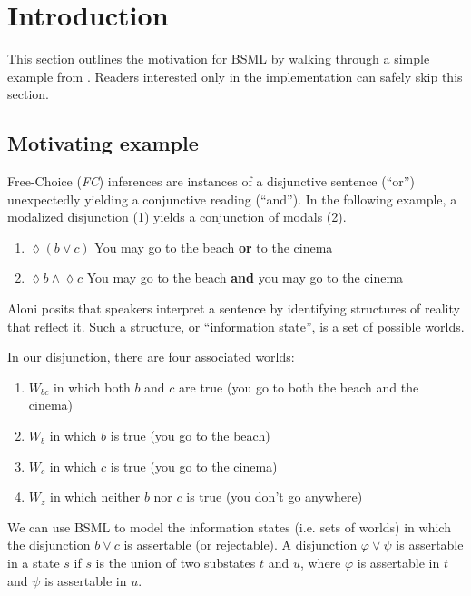 \section{Introduction}
This section outlines the motivation for BSML by walking through a simple example from \cite{Aloni2022}. Readers interested only in the implementation can safely skip this section.

\subsection{Motivating example}
Free-Choice (\textit{FC}) inferences are instances of a disjunctive sentence (``or'') unexpectedly yielding a conjunctive reading (``and''). In the following example, a modalized disjunction (1) yields a conjunction of modals (2).

\begin{enumerate}
\item $\lozenge(b\vee c)$ You may go to the beach \textbf{or} to the cinema
\item $\lozenge b \wedge \lozenge c$ You may go to the beach \textbf{and} you may go to the cinema
\end{enumerate}

Aloni \cite{Aloni2022} posits that speakers interpret a sentence by identifying structures of reality that reflect it. Such a structure, or ``information state'', is a set of possible worlds.

In our disjunction, there are four associated worlds:

\begin{enumerate}
\item $W_{bc}$ in which both $b$ and $c$ are true (you go to both the beach and the cinema)
\item $W_b$ in which $b$ is true (you go to the beach)
\item $W_c$ in which $c$ is true (you go to the cinema)
\item $W_z$ in which neither $b$ nor $c$ is true (you don't go anywhere)
\end{enumerate}

 We can use BSML to model the information states (i.e. sets of worlds) in which the disjunction $b\vee c$ is assertable (or rejectable). A disjunction $\varphi\vee\psi$ is assertable in a state $s$ if $s$ is the union of two substates $t$ and $u$, where $\varphi$ is assertable in $t$ and $\psi$ is assertable in $u$.

